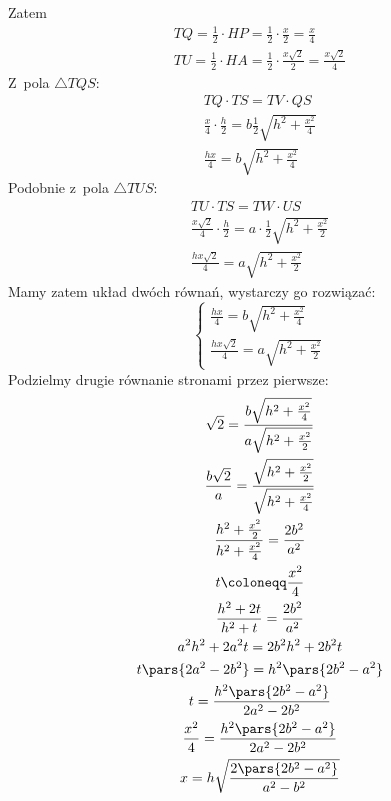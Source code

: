 Zatem
\begin{gather*}
    TQ = \frac{1}{2} \cdot HP = \frac{1}{2} \cdot \frac{x}{2} = \frac{x}{4}\\
    TU = \frac{1}{2} \cdot HA = \frac{1}{2} \cdot \frac{x\sqrt{2}}{2} = \frac{x\sqrt{2}}{4}
\end{gather*}
Z~pola \(\triangle{TQS}\):
\begin{gather*}
    TQ \cdot TS = TV \cdot QS\\
    \frac{x}{4} \cdot \frac{h}{2} = b\frac{1}{2}\sqrt{h^2 + \frac{x^2}{4}}\\
    \frac{hx}{4} = b\sqrt{h^2 + \frac{x^2}{4}}
\end{gather*}
Podobnie z~pola \(\triangle{TUS}\):
\begin{gather*}
    TU \cdot TS = TW \cdot US\\
    \frac{x\sqrt{2}}{4} \cdot \frac{h}{2} = a \cdot \frac{1}{2}\sqrt{h^2 + \frac{x^2}{2}}\\
    \frac{hx\sqrt{2}}{4} = a\sqrt{h^2 + \frac{x^2}{2}}
\end{gather*}
Mamy zatem układ dwóch równań, wystarczy go rozwiązać:
\begin{equation*}
    \begin{cases}
        \frac{hx}{4} = b\sqrt{h^2 + \frac{x^2}{4}}\\
        \frac{hx\sqrt{2}}{4} = a\sqrt{h^2 + \frac{x^2}{2}}
    \end{cases}
\end{equation*}
Podzielmy drugie równanie stronami przez pierwsze:
\begin{gather*}
    \sqrt{2} = \frac{b\sqrt{h^2 + \frac{x^2}{4}}}{a\sqrt{h^2 + \frac{x^2}{2}}}\\
    \frac{b\sqrt{2}}{a} = \frac{\sqrt{h^2 + \frac{x^2}{2}}}{\sqrt{h^2 + \frac{x^2}{4}}}\\
    \frac{h^2 + \frac{x^2}{2}}{h^2 + \frac{x^2}{4}} = \frac{2b^2}{a^2}\\
    t \coloneqq \frac{x^2}{4}\\
    \frac{h^2 + 2t}{h^2 + t} = \frac{2b^2}{a^2}\\
    a^2h^2 + 2a^2t = 2b^2h^2  + 2b^2t\\
    t\pars{2a^2 - 2b^2} = h^2\pars{2b^2 - a^2}\\
    t = \frac{h^2\pars{2b^2 - a^2}}{2a^2 - 2b^2}\\
    \frac{x^2}{4} = \frac{h^2\pars{2b^2 - a^2}}{2a^2 - 2b^2}\\
    x = h\sqrt{\frac{2\pars{2b^2 - a^2}}{a^2 - b^2}}
\end{gather*}
